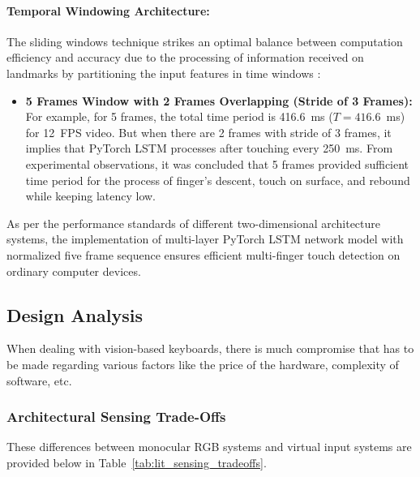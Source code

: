 \paragraph{Temporal Windowing Architecture:}
The sliding windows technique strikes an optimal balance between computation efficiency and accuracy due to the processing of information received on landmarks by partitioning the input features in time windows \cite{Simao2016Unsupervised, Doan2022Efficient, Gammulle2021TMMF}:
\begin{itemize}
    \item \textbf{5 Frames Window with 2 Frames Overlapping (Stride of 3 Frames):} For example, for 5 frames, the total time period is 416.6~ms ($T = 416.6$~ms) for 12~FPS video. But when there are 2 frames with stride of 3 frames, it implies that PyTorch LSTM processes after touching every 250~ms. From experimental observations, it was concluded that 5 frames provided sufficient time period for the process of finger's descent, touch on surface, and rebound while keeping latency low.
\end{itemize}

As per the performance standards of different two-dimensional architecture systems, the implementation of multi-layer PyTorch LSTM network model with normalized five frame sequence ensures efficient multi-finger touch detection on ordinary computer devices.

\subsection{Design Analysis}
\label{subsec:lit_design_analysis}
When dealing with vision-based keyboards, there is much compromise that has to be made regarding various factors like the price of the hardware, complexity of software, etc.

\subsubsection{Architectural Sensing Trade-Offs}
These differences between monocular RGB systems and virtual input systems are provided below in Table~\ref{tab:lit_sensing_tradeoffs}.

